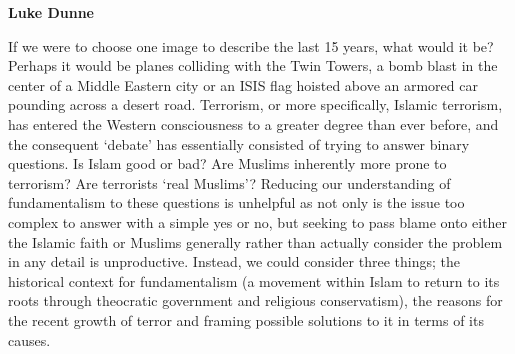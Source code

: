 \documentclass[10pt,a4paper]{article}
\begin{document}
\textbf{Luke Dunne}

\begin{multicols}{2}
If we were to choose one image to describe the last 15 years, what would it be? Perhaps it would be planes colliding with the Twin Towers, a bomb blast in the center of a Middle Eastern city or an ISIS flag hoisted above an armored car pounding across a desert road. Terrorism, or more specifically, Islamic terrorism, has entered the Western consciousness to a greater degree than ever before, and the consequent ‘debate’ has essentially consisted of trying to answer binary questions. Is Islam good or bad? Are Muslims inherently more prone to terrorism? Are terrorists ‘real Muslims’? Reducing our understanding of fundamentalism to these questions is unhelpful as not only is the issue too complex to answer with a simple yes or no, but seeking to pass blame onto either the Islamic faith or Muslims generally rather than actually consider the problem in any detail is unproductive. Instead, we could consider three things; the historical context for fundamentalism (a movement within Islam to return to its roots through theocratic government and religious conservatism), the reasons for the recent growth of terror and framing possible solutions to it in terms of its causes.


\end{multicols}
\end{document}
